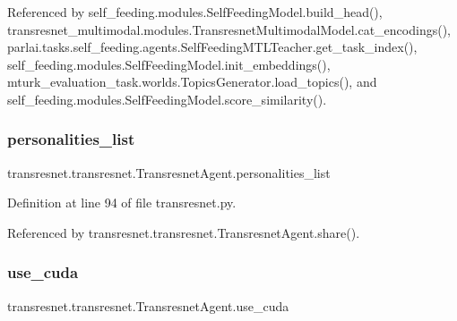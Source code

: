 Referenced by self\+\_\+feeding.\+modules.\+Self\+Feeding\+Model.\+build\+\_\+head(), transresnet\+\_\+multimodal.\+modules.\+Transresnet\+Multimodal\+Model.\+cat\+\_\+encodings(), parlai.\+tasks.\+self\+\_\+feeding.\+agents.\+Self\+Feeding\+M\+T\+L\+Teacher.\+get\+\_\+task\+\_\+index(), self\+\_\+feeding.\+modules.\+Self\+Feeding\+Model.\+init\+\_\+embeddings(), mturk\+\_\+evaluation\+\_\+task.\+worlds.\+Topics\+Generator.\+load\+\_\+topics(), and self\+\_\+feeding.\+modules.\+Self\+Feeding\+Model.\+score\+\_\+similarity().

\mbox{\label{classtransresnet_1_1transresnet_1_1TransresnetAgent_ad13b2b0e0cd097524df5b6b86fdcf2d6}} 
\subsubsection{\texorpdfstring{personalities\+\_\+list}{personalities\_list}}
{\footnotesize\ttfamily transresnet.\+transresnet.\+Transresnet\+Agent.\+personalities\+\_\+list}



Definition at line 94 of file transresnet.\+py.



Referenced by transresnet.\+transresnet.\+Transresnet\+Agent.\+share().

\mbox{\label{classtransresnet_1_1transresnet_1_1TransresnetAgent_ae102526b67781d47a4b622782123748a}} 
\subsubsection{\texorpdfstring{use\+\_\+cuda}{use\_cuda}}
{\footnotesize\ttfamily transresnet.\+transresnet.\+Transresnet\+Agent.\+use\+\_\+cuda}



